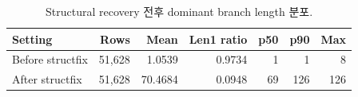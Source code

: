 \begin{table}[t]
\centering
\caption{Structural recovery 전후 dominant branch length 분포.}
\label{tab:branch-recovery}
\begin{tabular}{lrrrrrr}
\toprule
Setting & Rows & Mean & Len1 ratio & p50 & p90 & Max \\
\midrule
Before structfix & 51,628 & 1.0539 & 0.9734 & 1 & 1 & 8 \\
After structfix & 51,628 & 70.4684 & 0.0948 & 69 & 126 & 126 \\
\bottomrule
\end{tabular}
\end{table}
